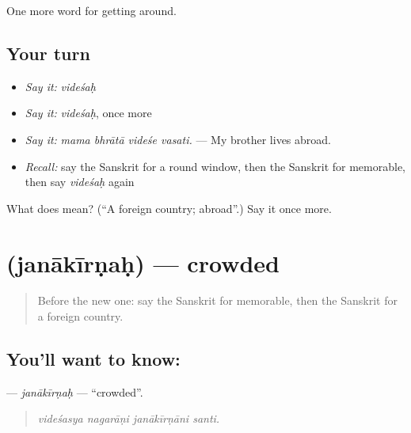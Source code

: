 \begin{grammarlens}[title={What you've built}]
One more word for getting around.
\end{grammarlens}

\subsection*{Your turn}
\begin{itemize}
\raggedright
  \item \emph{Say it:} \emph{videśaḥ}
  \item \emph{Say it:} \emph{videśaḥ}, once more
  \item \emph{Say it:} \emph{mama bhrātā videśe vasati.} — My brother lives abroad.
  \item \emph{Recall:} say the Sanskrit for a round window, then the Sanskrit for memorable, then say \emph{videśaḥ} again
\end{itemize}

\begin{tcolorbox}[breakable,colback=teal!4,colframe=teal!35!black,title={Before you move on}]
What does  mean? (\textquotedblleft{}A foreign country; abroad\textquotedblright{}.) Say it once more.
\end{tcolorbox}
\section[\texorpdfstring{\sk{जनाकीर्णः} (janākīrṇaḥ)}{जनाकीर्णः (janākīrṇaḥ)}]{ (janākīrṇaḥ) — crowded}

\label{lesson:SA-C426-janakirnah}



\begin{quote}
Before the new one: say the Sanskrit for memorable, then the Sanskrit for a foreign country.
\end{quote}

\subsection*{You'll want to know: }
\textbf{} — \emph{janākīrṇaḥ} — \textquotedblleft{}crowded\textquotedblright{}.

\begin{quote}
   
\end{quote}

\begin{quote}
\emph{videśasya nagarāṇi janākīrṇāni santi.}
\end{quote}

